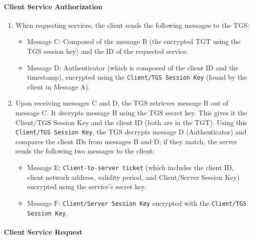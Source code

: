 \paragraph{Client Service Authorization}
\begin{enumerate}
	\item When requesting services, the client sends the following messages to the TGS:
	      \begin{itemize}
		      \item Message C: Composed of the message B (the encrypted TGT using the TGS session key) and the ID of the requested service.
		      \item Message D: Authenticator (which is composed of the client ID and the timestamp), encrypted using the \texttt{Client/TGS Session Key} (found by the client in Message A).
	      \end{itemize}
	\item Upon receiving messages C and D, the TGS retrieves message B out of message C. It decrypts message B using the TGS secret key. This gives it the Client/TGS Session Key and the client ID (both are in the TGT). Using this \texttt{Client/TGS Session Key}, the TGS decrypts message D (Authenticator) and compares the client IDs from messages B and D; if they match, the server sends the following two messages to the client:

	      \begin{itemize}
		      \item Message E: \texttt{Client-to-server ticket} (which includes the client ID, client network address, validity period, and Client/Server Session Key) encrypted using the service's secret key.
		      \item Message F: \texttt{Client/Server Session Key} encrypted with the \texttt{Client/TGS Session Key}.
	      \end{itemize}
\end{enumerate}



\paragraph{Client Service Request}

